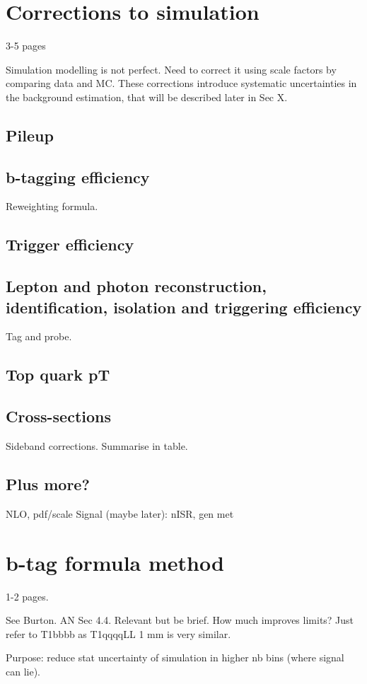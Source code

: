 \section{Corrections to simulation}
3-5 pages

Simulation modelling is not perfect. Need to correct it using scale factors by 
comparing data and MC. These corrections introduce systematic uncertainties in 
the background estimation, that will be described later in Sec X.

\subsection{Pileup}
\subsection{b-tagging efficiency}
Reweighting formula.
\subsection{Trigger efficiency}
\subsection{Lepton and photon reconstruction, identification, isolation and 
triggering efficiency}
Tag and probe.
\subsection{Top quark pT}
\subsection{Cross-sections}
Sideband corrections.
Summarise in table.

\subsection{Plus more?}
NLO, pdf/scale
Signal (maybe later): nISR, gen met

\section{b-tag formula method}
1-2 pages.

See Burton. AN Sec 4.4.
Relevant but be brief.
How much improves limits? Just refer to T1bbbb as T1qqqqLL 1 mm is very similar.

Purpose: reduce stat uncertainty of simulation in higher nb bins (where signal 
can lie).

